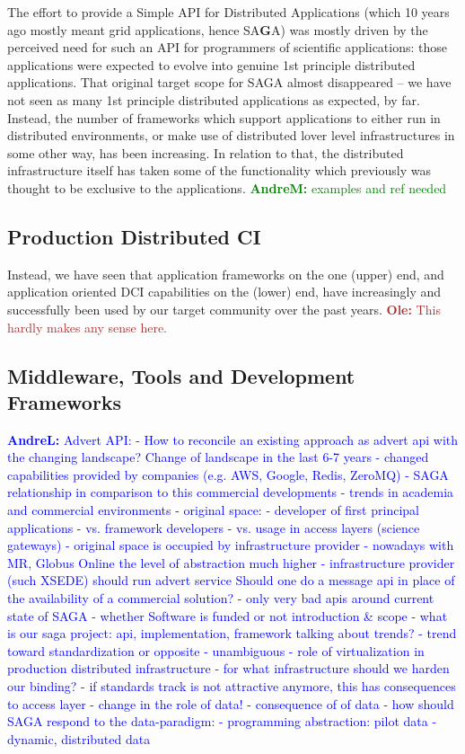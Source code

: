 \documentclass{article}
\newcommand{\B}[1]{\textbf{#1}}
\newcommand{\amnote}[1]{{\textcolor{green}{   \B{AndreM:  } #1 }}}
\newcommand{\alnote}[1]{{\textcolor{blue}{    \B{AndreL:  } #1 }}}
\newcommand{\ownote}[1]{{\textcolor{Brown}{   \B{Ole:     } #1 }}}
\newcommand{\amnote}[1]{}
\newcommand{\alnote}[1]{}
\newcommand{\ownote}[1]{}
\begin{document}
  The effort to provide a Simple API for Distributed Applications
  (which 10 years ago mostly meant grid applications, hence SA\B{G}A)
  was mostly driven by the perceived need for such an API for
  programmers of scientific applications: those applications were
  expected to evolve into genuine 1st principle distributed
  applications.  That original target scope for SAGA almost
  disappeared -- we have not seen as many 1st principle distributed
  applications as expected, by far.  Instead, the number of frameworks
  which support applications to either run in distributed
  environments, or make use of distributed lover level infrastructures
  in some other way, has been increasing.  In relation to that, the
  distributed infrastructure itself has taken some of the
  functionality which previously was thought to be exclusive to
  the applications. \amnote{examples and ref needed}


 \subsection{Production Distributed CI}

  Instead, we have seen that application frameworks on the one (upper)
  end, and application oriented DCI capabilities on the (lower) end,
  have increasingly and successfully been used by our target community
  over the past years.
  \ownote{This hardly makes any sense here.}


 \subsection{Middleware, Tools and Development Frameworks}


\alnote{Advert API: - How to reconcile an existing approach as advert
  api with the changing landscape?  Change of landscape in the last
  6-7 years - changed capabilities provided by companies (e.g. AWS,
  Google, Redis, ZeroMQ) - SAGA relationship in comparison to this
  commercial developments - trends in academia and commercial
  environments - original space: - developer of first principal
  applications - vs. framework developers - vs. usage in access layers
  (science gateways) - original space is occupied by infrastructure
  provider - nowadays with MR, Globus Online the level of abstraction
  much higher - infrastructure provider (such XSEDE) should run advert
  service Should one do a message api in place of the availability of
  a commercial solution?  - only very bad apis around current state of
  SAGA - whether Software is funded or not introduction \& scope -
  what is our saga project: api, implementation, framework talking
  about trends?  - trend toward standardization or opposite -
  unambiguous - role of virtualization in production distributed
  infrastructure - for what infrastructure should we harden our
  binding?  - if standards track is not attractive anymore, this has
  consequences to access layer - change in the role of data!  -
  consequence of of data - how should SAGA respond to the
  data-paradigm: - programming abstraction: pilot data - dynamic,
  distributed data }
\end{document}
